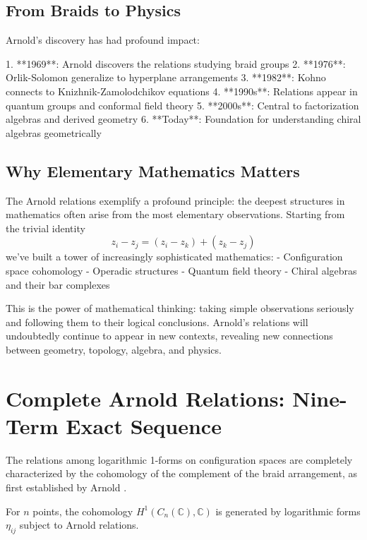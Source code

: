 \subsection{From Braids to Physics}

Arnold's discovery has had profound impact:

1. **1969**: Arnold discovers the relations studying braid groups
2. **1976**: Orlik-Solomon generalize to hyperplane arrangements  
3. **1982**: Kohno connects to Knizhnik-Zamolodchikov equations
4. **1990s**: Relations appear in quantum groups and conformal field theory
5. **2000s**: Central to factorization algebras and derived geometry
6. **Today**: Foundation for understanding chiral algebras geometrically

\subsection{Why Elementary Mathematics Matters}

The Arnold relations exemplify a profound principle: the deepest structures in mathematics often arise from the most elementary observations. Starting from the trivial identity
$$z_i - z_j = (z_i - z_k) + (z_k - z_j)$$
we've built a tower of increasingly sophisticated mathematics:
- Configuration space cohomology
- Operadic structures
- Quantum field theory
- Chiral algebras and their bar complexes

This is the power of mathematical thinking: taking simple observations seriously and following them to their logical conclusions. Arnold's relations will undoubtedly continue to appear in new contexts, revealing new connections between geometry, topology, algebra, and physics.

\section{Complete Arnold Relations: Nine-Term Exact Sequence}
\label{sec:arnold-nine-term}

\begin{theorem}\label{thm:arnold-complete-exact}
The relations among logarithmic 1-forms on configuration spaces are completely 
characterized by the cohomology of the complement of the braid arrangement, as 
first established by Arnold \cite{Arnold69}.

For $n$ points, the cohomology $H^1(C_n(\mathbb{C}), \mathbb{C})$ is generated by 
logarithmic forms $\eta_{ij}$ subject to Arnold relations.
\end{theorem}

